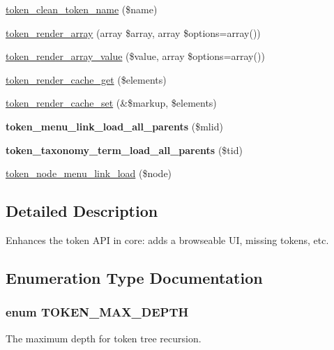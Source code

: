 \begin{DoxyCompactItemize}
\item 
\hyperlink{token_8module_aa3b8e39ad2ee70c9b913d3b3ba07917f}{token\_\-clean\_\-token\_\-name} (\$name)
\item 
\hyperlink{token_8module_a53f85bf43961f4d639af9cee78caee26}{token\_\-render\_\-array} (array \$array, array \$options=array())
\item 
\hyperlink{token_8module_aa5c8c0b76fdd4786224a066ce1387833}{token\_\-render\_\-array\_\-value} (\$value, array \$options=array())
\item 
\hyperlink{token_8module_ade265e3948eec87805cabf40bf0c233d}{token\_\-render\_\-cache\_\-get} (\$elements)
\item 
\hyperlink{token_8module_ab8f5c3ba81f8ff179b4e5be70a3ab54d}{token\_\-render\_\-cache\_\-set} (\&\$markup, \$elements)
\item 
\hypertarget{token_8module_a96e8ef3ec70b9d3652bd58c3208f9842}{
{\bfseries token\_\-menu\_\-link\_\-load\_\-all\_\-parents} (\$mlid)}
\label{token_8module_a96e8ef3ec70b9d3652bd58c3208f9842}

\item 
\hypertarget{token_8module_ad51a0a0aed3cad4a3981b472d2d34ccf}{
{\bfseries token\_\-taxonomy\_\-term\_\-load\_\-all\_\-parents} (\$tid)}
\label{token_8module_ad51a0a0aed3cad4a3981b472d2d34ccf}

\item 
\hyperlink{token_8module_a549ee65529db4c066963f05fad4bbc15}{token\_\-node\_\-menu\_\-link\_\-load} (\$node)
\end{DoxyCompactItemize}


\subsection{Detailed Description}
Enhances the token API in core: adds a browseable UI, missing tokens, etc. 

\subsection{Enumeration Type Documentation}
\hypertarget{token_8module_aeee6a9ddcb3b88d686109d24df779b49}{
\subsubsection[{TOKEN\_\-MAX\_\-DEPTH}]{\setlength{\rightskip}{0pt plus 5cm}enum {\bf TOKEN\_\-MAX\_\-DEPTH}}}
\label{token_8module_aeee6a9ddcb3b88d686109d24df779b49}
The maximum depth for token tree recursion. 


